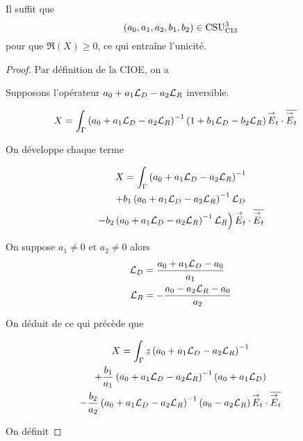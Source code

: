   
  \begin{prop}
    \label{prop:csu:ci3-3}
    Il suffit que
    \begin{equation*}
      (a_0,a_1,a_2,b_1,b_2) \in \CSU[3]{CI3}
    \end{equation*}
    pour que \(\Re(X)\ge 0\), ce qui entraîne l'unicité.
  \end{prop}

  \begin{proof}
    Par définition de la CIOE, on a

    Supposons l'opérateur \(a_0 + a_1 \LD - a_2 \LR\) inversible.

    \begin{align*}
      X &= \int_\Gamma \left(a_0 + a_1 \LD - a_2 \LR \right)^{-1}\left( 1 + b_1 \LD - b_2 \LR \right) \vE_t\cdot \conj{\vE_t}
    \end{align*}

    On développe chaque terme

    \begin{multline*}
      X = \int_\Gamma \left(a_0 + a_1 \LD - a_2 \LR \right)^{-1}
      \\
      + b_1 \left(a_0 + a_1 \LD - a_2 \LR \right)^{-1}\LD
      \\
      \left.
      - b_2 \left(a_0 + a_1 \LD - a_2 \LR \right)^{-1}\LR \right) \vE_t\cdot \conj{\vE_t}
    \end{multline*}

    On suppose \(a_1\not=0\) et \(a_2\not=0\) alors
    \begin{align*}
      \LD & = \frac{a_0 + a_1 \LD - a_0}{a_1}
      \\
      \LR & = -\frac{a_0 - a_2 \LR - a_0}{a_2}
    \end{align*}


    On déduit de ce qui précède que

    \begin{multline*}
      X = \int_\Gamma z\left(a_0 + a_1 \LD - a_2 \LR \right)^{-1}
      \\
      + \frac{b_1}{a_1} \left(a_0 + a_1 \LD - a_2 \LR \right)^{-1}\left(a_0+a_1\LD\right)
      \\
      - \frac{b_2}{a_2} \left(a_0 + a_1 \LD - a_2 \LR \right)^{-1}\left(a_0-a_2\LR\right) \vE_t\cdot \conj{\vE_t}
    \end{multline*}

    On définit

    \newcommand{\vV}{\vect{V}}
    \newcommand{\vW}{\vect{W}}


\end{proof}
